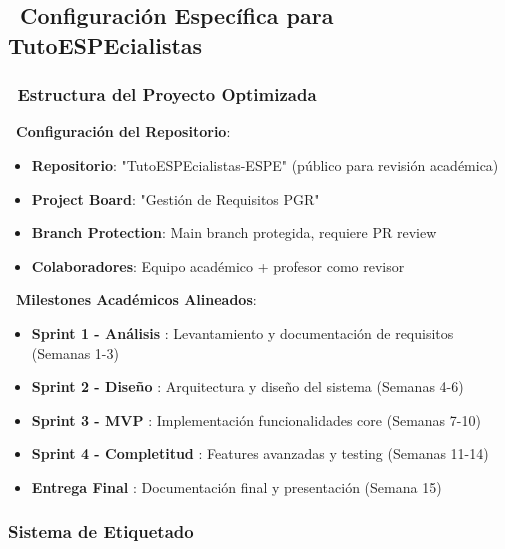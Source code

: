 \documentclass[12pt,a4paper]{article}
\begin{document}
\subsection{\faWrench\ Configuración Específica para TutoESPEcialistas}

\subsubsection{\faFolder\ Estructura del Proyecto Optimizada}

\begin{tcolorbox}[colback=lightblue!10, colframe=headercolor, rounded corners, boxrule=1pt]
\textbf{\faRocket\ Configuración del Repositorio}:
\begin{itemize}[itemsep=0.4em]
    \item \textcolor{headercolor}{\faCodeBranch} \textbf{Repositorio}: "TutoESPEcialistas-ESPE" (público para revisión académica)
    \item \textcolor{darkblue}{\faProjectDiagram} \textbf{Project Board}: "Gestión de Requisitos PGR"
    \item \textcolor{successgreen}{\faShieldAlt} \textbf{Branch Protection}: Main branch protegida, requiere PR review
    \item \textcolor{warningorange}{\faUsers} \textbf{Colaboradores}: Equipo académico + profesor como revisor
\end{itemize}

\textbf{\faBullseye\ Milestones Académicos Alineados}:
\begin{itemize}[itemsep=0.3em]
    \item \textbf{Sprint 1 - Análisis} \faSearch: Levantamiento y documentación de requisitos (Semanas 1-3)
    \item \textbf{Sprint 2 - Diseño} \faDraftingCompass: Arquitectura y diseño del sistema (Semanas 4-6)
    \item \textbf{Sprint 3 - MVP} \faCode: Implementación funcionalidades core (Semanas 7-10)
    \item \textbf{Sprint 4 - Completitud} \faCheckCircle: Features avanzadas y testing (Semanas 11-14)
    \item \textbf{Entrega Final} \faTrophy: Documentación final y presentación (Semana 15)
\end{itemize}
\end{tcolorbox}

\subsubsection{Sistema de Etiquetado}
\end{document}
